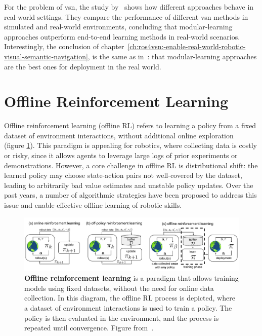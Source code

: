 For the problem of \acrshort{vsn}, the study by~\cite{gervet2022} shows how different approaches behave in real-world settings.
They compare the performance of different \acrshort{vsn} methods in simulated and real-world environments, concluding that modular-learning approaches outperform end-to-end learning methods in real-world scenarios.
Interestingly, the conclusion of chapter~\ref{ch:ros4vsn:-enable-real-world-robotic-visual-semantic-navigation}, is the same as in~\cite{gervet2022}: that modular-learning approaches are the best ones for deployment in the real world.

\section{Offline Reinforcement Learning}\label{sec:offline-reinforcement-learning}

Offline reinforcement learning (offline RL) refers to learning a policy from a fixed dataset of environment interactions, without additional online exploration~\cite{levine2020} (figure \ref{fig:diagram-offline}).
This paradigm is appealing for robotics, where collecting data is costly or risky, since it allows agents to leverage large logs of prior experiments or demonstrations.
However, a core challenge in offline RL is distributional shift: the learned policy may choose state-action pairs not well-covered by the dataset, leading to arbitrarily bad value estimates and unstable policy updates.
Over the past years, a number of algorithmic strategies have been proposed to address this issue and enable effective offline learning of robotic skills.

\begin{figure}
    \includegraphics[width=\textwidth]{figures/related_work/diagram_offline}
    \caption{\textbf{Offline reinforcement learning} is a paradigm that allows training models using fixed datasets, without the need for online data collection.
    In this diagram, the offline RL process is depicted, where a dataset of environment interactions is used to train a policy.
    The policy is then evaluated in the environment, and the process is repeated until convergence.
    Figure from~\cite{levine2020}.}
    \label{fig:diagram-offline}
\end{figure}

